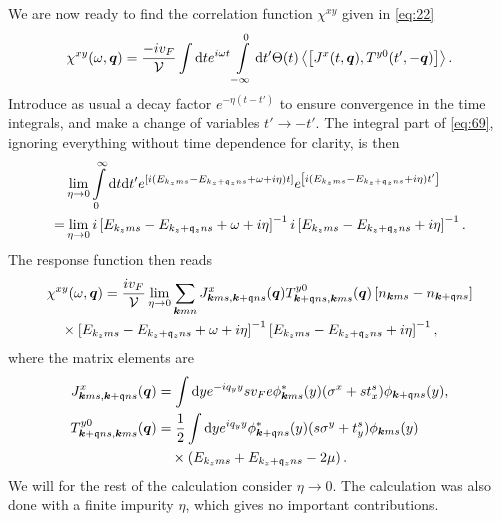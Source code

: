 We are now ready to find the correlation function $\chi ^{xy}$ given in \cref{eq:22}
\begin{equation}
  \label{eq:69}
  \chi ^{xy}(\omega, \vec{q}) =
  \frac{-i v_F}{\mathcal{V}  }
  \int \mathrm{d}t e^{i \omega t} \int\limits_{-\infty }^0 \mathrm{d}t'
  \Theta (t)
  \Braket{\left[
J^x(t, \vec{q}), T^{y 0}(t', -\vec{q})
    \right]}.
\end{equation}
Introduce as usual a decay factor $e^{-\eta (t-t')}$ to ensure convergence in the time integrals, and make a change of variables $t' \to -t'	$.
The integral part of \cref{eq:69}, ignoring everything without time dependence for clarity, is then
\begin{align}
  &\lim_{\eta \to 0}
  \int\limits_{0}^{\infty } \mathrm{d}t \mathrm{d}t'
    e^{\left[ i \left(
        E_{k_z m s} - E_{k_z+\mathfrak{q}_z ns} + \omega   + i \eta
      \right) t \right]}
    e^{\left[ i \left(
        E_{k_z m s} - E_{k_z+\mathfrak{q}_z ns} + i \eta
      \right) t' \right]} \nonumber \\
  =
  &\lim_{\eta \to 0} i \left[ E_{k_zms} - E_{k_z+\mathfrak{q}_z ns} + \omega   + i\eta   \right]^{-1}
i \left[ E_{k_zms} - E_{k_z+\mathfrak{q}_z ns} + i \eta   \right]^{-1}.
\end{align}
The response function then reads
\begin{equation}
  \begin{split}
  &\chi ^{xy}(\omega , \bm{q}) =
  \frac{i v_F  }{\mathcal{V} }
  \lim_{\eta \to 0}
  \sum\limits_{\bm{k}mn}^{}
  J^x_{\bm{k}ms, \bm{k}+\mathfrak{q}ns}(\bm{q})
  T^{y 0}_{\bm{k}+\mathfrak{q}ns, \bm{k}ms}(\bm{q})
  \left[ n_{\bm{k}ms}- n_{\bm{k}+\mathfrak{q} ns} \right]\\
  &\quad\times\left[ E_{k_zms} - E_{k_z+\mathfrak{q}_z ns} + \omega   + i\eta   \right]^{-1}
  \left[ E_{k_zms} - E_{k_z+\mathfrak{q}_z ns} + i \eta   \right]^{-1},
  \end{split}
\end{equation}
where the matrix elements are
\begin{align}\label{eq:70}
  J^x_{\bm{k}ms, \bm{k}+\mathfrak{q}ns}(\bm{q}) &= \int \mathrm{d}y
                                                e^{-i q_y y}
                                                 s v_F e\phi ^{*}_{\bm{k}m s}(y)
                                                 (\sigma^x + s t^s_x)
                                                \phi _{\bm{k}+\mathfrak{q}n s}(y),\\
\label{eq:9} T^{y 0}_{\bm{k}+\mathfrak{q} n s, \bm{k} m s}(\bm{q}) &= \frac{1}{2}
              \int \mathrm{d}y
              e^{iq_y y}
              \phi ^{*}_{\bm{k}+\mathfrak{q} n s}(y)
              (s\sigma^y + t^s_y )
              \phi _{\bm{k} m s}(y)\\
\nonumber              &\quad \times \left(
              E_{k_zm s} + E_{k_z+\mathfrak{q}_z n s} - 2 \mu
              \right).
\end{align}
We will for the rest of the calculation consider \( \eta \to 0 \).
The calculation was also done with a finite impurity \( \eta \), which gives no important contributions.

